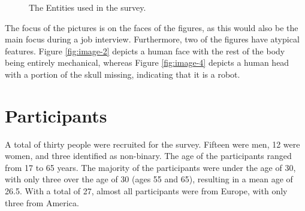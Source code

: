 \begin{figure}[t!]
 \centering
 \qquad
 \qquad
      
\caption{The Entities used in the survey.}
\label{fig:used-entities}

\end{figure}
The focus of the pictures is on the faces of the figures, as this would also be the main focus during a job interview. Furthermore, two of the figures have atypical features. Figure \ref{fig:image-2} depicts a human face with the rest of the body being entirely mechanical, whereas Figure \ref{fig:image-4} depicts a human head with a portion of the skull missing, indicating that it is a robot.

\section{Participants}
A total of thirty people were recruited for the survey. Fifteen were men, 12 were women, and three identified as non-binary. The age of the participants ranged from 17 to 65 years. The majority of the participants were under the age of 30, with only three over the age of 30 (ages 55 and 65), resulting in a mean age of 26.5. With a total of 27, almost all participants were from Europe, with only three from America.

